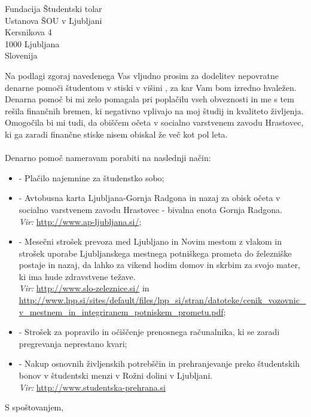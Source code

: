 \documentclass[a4paper]{scrlttr2}
\begin{document}
\begin{letter}{Fundacija Študentski tolar \\ Ustanova ŠOU v Ljubljani \\ Kersnikova 4 \\ 1000 Ljubljana \\ Slovenija}
\pagebreak

Na podlagi zgoraj navedenega Vas vljudno prosim za dodelitev nepovratne denarne pomoči študentom v stiski v višini , za kar Vam bom izredno hvaležen. Denarna pomoč bi mi zelo pomagala pri poplačilu vseh obveznosti in me s tem rešila finančnih bremen, ki negativno vplivajo na moj študij in kvaliteto življenja. Omogočila bi mi tudi, da obiščem očeta v socialno varstvenem zavodu Hrastovec, ki ga zaradi finančne stiske nisem obiskal že več kot pol leta.
\\
\\
Denarno pomoč nameravam porabiti na naslednji način:
\begin{itemize}
\item {} - Plačilo najemnine za študenstko sobo;

\item {} - Avtobusna karta Ljubljana-Gornja Radgona in nazaj za obisk očeta v socialno varstvenem zavodu Hrastovec - bivalna enota Gornja Radgona. \\
\textit{Vir:} \url{http://www.ap-ljubljana.si/};

\item {} - Mesečni strošek prevoza med Ljubljano in Novim mestom z vlakom in strošek uporabe Ljubljanskega mestnega potniškega prometa do železniške postaje in nazaj, da lahko za vikend hodim domov in skrbim za svojo mater, ki ima hude zdravstvene težave. \\
\textit{Vir:} \url{http://www.slo-zeleznice.si/} in \url{http://www.lpp.si/sites/default/files/lpp_si/stran/datoteke/cenik_vozovnic_v_mestnem_in_integriranem_potniskem_prometu.pdf};

\item {} - Strošek za popravilo in očiščenje prenosnega računalnika, ki se zaradi pregrevanja neprestano kvari;

\item {} - Nakup osnovnih življenskih potrebščin in prehranjevanje preko študentskih bonov v študentski menzi v Rožni dolini v Ljubljani. \\ \textit{Vir:} \url{http://www.studentska-prehrana.si} 
\end{itemize}



\closing{S spoštovanjem,}


\end{letter}
\end{document}
